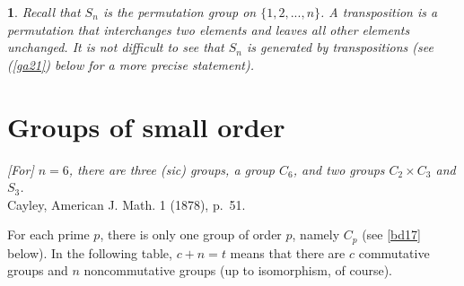 \documentclass[a4paper,11pt,final,openany]{memoir}%
\newtheorem{plain}[X]{}
\theoremstyle{nonumberplain}
\begin{document}
\begin{plain}
\label{bd8d}Recall that $S_{n}$
%
is the permutation group on $\{1,2,...,n\}$. A \emph{transposition}%
is a permutation that interchanges two elements and leaves all other elements
unchanged. It is not difficult to see that $S_{n}$ is generated by
transpositions (see (\ref{ga21}) below for a more precise statement).
\end{plain}

\section{Groups of small order}%

%
\hfill\begin{minipage}{3.0in}
\textit{[For] $n=6$, there are three \textnormal{(sic)} groups, a group $C_6$, and two groups
$C_2\times C_3$ and $S_3$.}\\
Cayley, American J. Math. 1 (1878), p.~51.
\end{minipage}\bigskip

For each prime $p$, there is only one group of order $p$, namely $C_{p}$ (see
\ref{bd17} below). In the following table, $c+n=t$ means that there are $c$
commutative groups and $n$ noncommutative groups (up to isomorphism, of
course).\medskip
\end{document}
